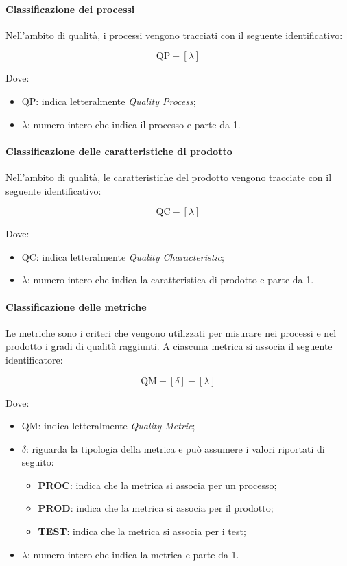 		\paragraph{Classificazione dei processi}

		Nell'ambito di qualità, i processi vengono tracciati con il seguente identificativo:

		\[
				\text{QP}-[\lambda]
		\]

		Dove:

		\begin{itemize}
			\item QP: indica letteralmente \textit{Quality Process};
			\item \(\lambda\): numero intero che indica il processo e parte da 1.
		\end{itemize}

		\paragraph{Classificazione delle caratteristiche di prodotto}

		Nell'ambito di qualità, le caratteristiche del prodotto vengono tracciate con il seguente identificativo:

		\[
				\text{QC}-[\lambda]
		\]

		Dove:

		\begin{itemize}
			\item QC: indica letteralmente \textit{Quality Characteristic};
			\item \(\lambda\): numero intero che indica la caratteristica di prodotto e parte da 1.
		\end{itemize}

		\paragraph{Classificazione delle metriche}

		Le metriche sono i criteri che vengono utilizzati per misurare nei processi e nel prodotto i gradi di qualità raggiunti. A ciascuna metrica si associa il seguente identificatore:

		\[
				\text{QM}-[\delta]-[\lambda]
		\]

		Dove:

		\begin{itemize}
			\item QM: indica letteralmente \textit{Quality Metric};
			\item \(\delta\): riguarda la tipologia della metrica e può assumere i valori riportati di seguito:
				\begin{itemize}
					\item \textbf{PROC}: indica che la metrica si associa per un processo;
					\item \textbf{PROD}: indica che la metrica si associa per il prodotto;
					\item \textbf{TEST}: indica che la metrica si associa per i test;
				\end{itemize}
			\item \(\lambda\): numero intero che indica la metrica e parte da 1.
		\end{itemize}

